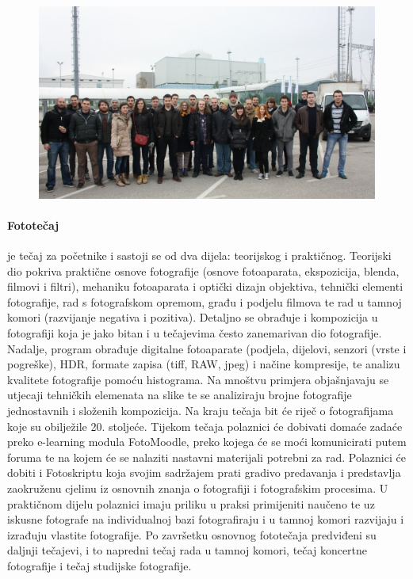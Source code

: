 \documentclass[12pt,a4paper,oneside]{article}
\begin{document}
	\begin{figure}[h!]
		\centering
		\vspace{5mm}
		\includegraphics[scale=0.25]{powertrip.jpg}	
	\end{figure}
	

	\paragraph{Fototečaj}je tečaj za početnike i sastoji se od dva dijela: teorijskog i praktičnog. Teorijski dio  pokriva praktične osnove fotografije (osnove fotoaparata, ekspozicija, blenda, filmovi i filtri), mehaniku  fotoaparata i optički dizajn objektiva, tehnički elementi fotografije, rad s fotografskom opremom, građu i podjelu filmova te rad u tamnoj komori (razvijanje negativa i pozitiva). Detaljno se obrađuje i kompozicija u fotografiji  koja je jako bitan i u tečajevima često zanemarivan dio fotografije. Nadalje, program obrađuje digitalne fotoaparate (podjela, dijelovi, senzori  (vrste i pogreške), HDR, formate zapisa (tiff, RAW, jpeg) i načine kompresije, te analizu kvalitete fotografije pomoću histograma. Na mnoštvu primjera objašnjavaju se utjecaji tehničkih elemenata na slike te se analiziraju brojne fotografije jednostavnih i složenih kompozicija. Na kraju tečaja bit će riječ o fotografijama koje su obilježile 20. stoljeće. Tijekom tečaja polaznici će dobivati domaće zadaće preko e-learning modula FotoMoodle, preko kojega će se moći komunicirati putem foruma te na kojem će se nalaziti nastavni materijali potrebni za rad. Polaznici će dobiti i Fotoskriptu koja svojim sadržajem prati gradivo predavanja i predstavlja zaokruženu cjelinu iz osnovnih znanja o fotografiji i fotografskim procesima. U praktičnom dijelu polaznici imaju priliku u praksi primijeniti naučeno te uz iskusne fotografe na individualnoj bazi fotografiraju i u tamnoj komori razvijaju i izrađuju vlastite fotografije. Po završetku osnovnog fototečaja predviđeni su daljnji tečajevi, i to napredni tečaj rada u tamnoj komori, tečaj koncertne fotografije i tečaj studijske fotografije.
	
\end{document}
